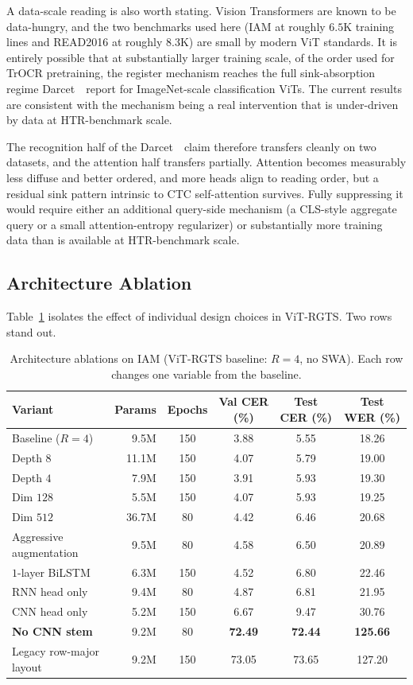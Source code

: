 A data-scale reading is also worth stating. Vision Transformers are known to be data-hungry, and the two benchmarks used here (IAM at roughly $6.5$K training lines and READ2016 at roughly $8.3$K) are small by modern ViT standards. It is entirely possible that at substantially larger training scale, of the order used for TrOCR pretraining, the register mechanism reaches the full sink-absorption regime Darcet~\etal\ report for ImageNet-scale classification ViTs. The current results are consistent with the mechanism being a real intervention that is under-driven by data at HTR-benchmark scale.

The recognition half of the Darcet~\etal\ claim therefore transfers cleanly on two datasets, and the attention half transfers partially. Attention becomes measurably less diffuse and better ordered, and more heads align to reading order, but a residual sink pattern intrinsic to CTC self-attention survives. Fully suppressing it would require either an additional query-side mechanism (a CLS-style aggregate query or a small attention-entropy regularizer) or substantially more training data than is available at HTR-benchmark scale.

\subsection{Architecture Ablation}
\label{sec:res_abl_arch}

Table~\ref{tab:ablations} isolates the effect of individual design choices in ViT-RGTS. Two rows stand out.

\begin{table}[h]
\centering
\footnotesize
\caption{Architecture ablations on IAM (ViT-RGTS baseline: $R = 4$, no SWA). Each row changes one variable from the baseline.}
\label{tab:ablations}
\begin{tabular}{lrcccc}
\toprule
Variant & Params & Epochs & Val CER (\%) & Test CER (\%) & Test WER (\%) \\
\midrule
Baseline ($R = 4$)      & 9.5M  & 150 & 3.88 & 5.55 & 18.26 \\
Depth $8$               & 11.1M & 150 & 4.07 & 5.79 & 19.00 \\
Depth $4$               & 7.9M  & 150 & 3.91 & 5.93 & 19.30 \\
Dim $128$               & 5.5M  & 150 & 4.07 & 5.93 & 19.25 \\
Dim $512$               & 36.7M & 80  & 4.42 & 6.46 & 20.68 \\
Aggressive augmentation & 9.5M  & 80  & 4.58 & 6.50 & 20.89 \\
$1$-layer BiLSTM        & 6.3M  & 150 & 4.52 & 6.80 & 22.46 \\
RNN head only           & 9.4M  & 80  & 4.87 & 6.81 & 21.95 \\
CNN head only           & 5.2M  & 150 & 6.67 & 9.47 & 30.76 \\
\textbf{No CNN stem}    & 9.2M  & 80  & \textbf{72.49} & \textbf{72.44} & \textbf{125.66} \\
Legacy row-major layout & 9.2M  & 150 & 73.05 & 73.65 & 127.20 \\
\bottomrule
\end{tabular}
\end{table}

